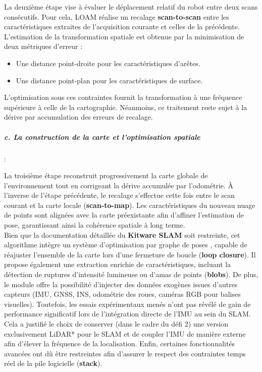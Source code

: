 La deuxième étape vise à évaluer le déplacement relatif du robot entre deux scans consécutifs. Pour cela, LOAM réalise un recalage \textbf{scan-to-scan} entre les caractéristiques extraites de l'acquisition courante et celles de la précédente. L'estimation de la transformation spatiale est obtenue par la minimisation de deux métriques d'erreur :\\
 
\begin{itemize}
    \item Une distance point-droite pour les caractéristiques d'arêtes.
    \item Une distance point-plan pour les caractéristiques de surface.\\
\end{itemize}  

L'optimisation sous ces contraintes fournit la transformation à une fréquence supérieure à celle de la cartographie. Néanmoins, ce traitement reste sujet à la dérive par accumulation des erreurs de recalage.

\subparagraph{c. La construction de la carte et l'optimisation spatiale}:

La troisième étape reconstruit progressivement la carte globale de l'environnement tout en corrigeant la dérive accumulée par l'odométrie. À l'inverse de l'étape précédente, le recalage s'effectue cette fois entre le scan courant et la carte locale (\textbf{scan-to-map}). Les caractéristiques du nouveau nuage de points sont alignées avec la carte préexistante afin d'affiner l'estimation de pose, garantissant ainsi la cohérence spatiale à long terme.\\

Bien que la documentation détaillée du \textbf{Kitware SLAM} soit restreinte, cet algorithme intègre un système d'optimisation par graphe de poses \cite{kitware_slam}, capable de réajuster l'ensemble de la carte lors d'une fermeture de boucle (\textbf{loop closure}). Il propose également une extraction enrichie de caractéristiques, incluant la détection de ruptures d'intensité lumineuse ou d'amas de points (\textbf{blobs}).
De plus, le module offre la possibilité d'injecter des données exogènes issues d'autres capteurs (IMU, GNSS, INS, odométrie des roues, caméras RGB pour balises visuelles). Toutefois, les essais expérimentaux menés n'ont pas révélé de gain de performance significatif lors de l'intégration directe de l'IMU au sein du SLAM. Cela a justifié le choix de conserver (dans le cadre du défi 2) une version exclusivement LiDAR* pour le SLAM et de coupler l'IMU de manière externe afin d'élever la fréquence de la localisation. Enfin, certaines fonctionnalités avancées ont dû être restreintes afin d'assurer le respect des contraintes temps réel de la pile logicielle (\textbf{stack}).


